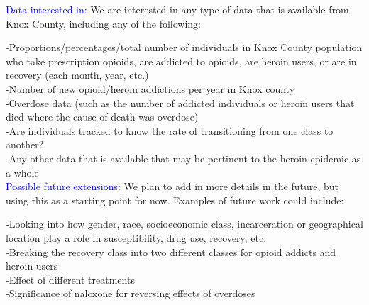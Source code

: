 \documentclass[12pt]{article}
\begin{document}
 \textcolor{blue}{Data interested in:} 
We are interested in any type of data that is available from Knox County, including any of the following: 

-Proportions/percentages/total number of individuals in Knox County population who take prescription opioids, are addicted to opioids, are heroin users, or are in recovery (each month, year, etc.) \\
-Number of new opioid/heroin addictions per year in Knox county \\
-Overdose data (such as the number of addicted individuals or heroin users that died where the cause of death was overdose) \\ %
-Are individuals tracked to know the rate of transitioning from one class to another? \\
-Any other data that is available that may be pertinent to the heroin epidemic as a whole \\

\textcolor{blue}{Possible future extensions:}
We plan to add in more details in the future, but using this as a starting point for now. Examples of future work could include: 

-Looking into how gender, race, socioeconomic class, incarceration or geographical location play a role in susceptibility, drug use, recovery, etc. \\
-Breaking the recovery class into two different classes for opioid addicts and heroin users \\
-Effect of different treatments \\
-Significance of naloxone for reversing effects of overdoses \\


\pagebreak

%

 
\end{document}
